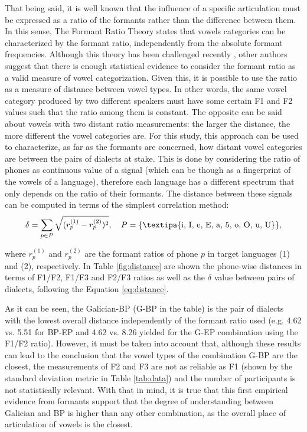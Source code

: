 \documentclass[a4paper,11pt]{article}
\begin{document}
     
 That being said, it is well known that the influence of a specific articulation must be expressed as a ratio of the formants rather than the difference between them. In this sense, The Formant Ratio Theory  \cite{pottersteinberg} states that vowels categories can be characterized by the formant ratio, independently from the absolute formant frequencies. Although this theory has been challenged recently \cite{johnoson}, other authors suggest that there is enough statistical evidence \cite{ratio} to consider the formant ratio as a valid measure of vowel categorization. Given this, it is possible to use the ratio as a measure of distance between vowel types. In other words, the same vowel category produced by two different speakers must have some certain F1 and F2 values such that the ratio among them is constant. The opposite can be said about vowels with two distant ratio measurements: the larger the distance, the more different the vowel categories are. For this study, this approach can be used to characterize, as far as the formants are concerned, how distant vowel categories are between the pairs of dialects at stake. This is done by considering the ratio of phones as continuous value of a signal (which can be though as a fingerprint of the vowels of a language), therefore each language has a different spectrum that only depends on the ratio of their formants. The distance between these signals  can be computed in terms of the simplest correlation method:
 \begin{equation}\label{eq:distance}
     \delta = \sum_{p \in {P}} \sqrt{(r_p^{(1)}-r_p^{(2)})^2}, \quad P = \{\text{\textipa{i, I, e, E, a, 5, o, O, u, U}}\},
 \end{equation}
 
 \noindent where $r_p^{(1)}$ and $r_p^{(2)}$ are the formant ratios of phone $p$ in target languages (1) and (2), respectively. In Table \ref{fig:distance} are shown the phone-wise distances in terms of  F1/F2, F1/F3 and F2/F3 ratios as well as the $\delta$ value between pairs of dialects, following the Equation \eqref{eq:distance}.
     
     
  As it can be seen, the Galician-BP (G-BP in the table) is the pair of dialects with the lowest overall distance independently of the formant ratio used (e.g. 4.62 vs. 5.51 for BP-EP and 4.62 vs. 8.26 yielded for the G-EP combination using the F1/F2 ratio). However, it must be taken into account that, although these results can lead to the conclusion that the vowel types of the combination G-BP are the closest, the measurements of F2 and F3 are not as reliable as F1 (shown by the standard deviation metric in Table \ref{tab:data}) and the number of participants is not statistically relevant. With that in mind, it is true that this first empirical evidence from formants support that the degree of understanding between Galician and BP is higher than any other combination, as the overall place of articulation of vowels is the closest.
  
\end{document}
